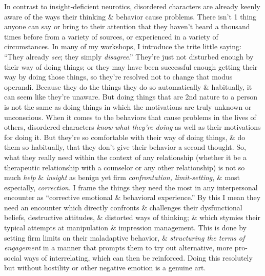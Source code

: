 \documentclass{article}
\numberwithin{equation}{section}
\begin{document}
In contrast to insight-deficient neurotics, disordered characters are already keenly aware of the ways their thinking \& behavior cause problems. There isn't 1 thing anyone can say or bring to their attention that they haven't heard a thousand times before from a variety of sources, or experienced in a variety of circumstances. In many of my workshops, I introduce the trite little saying: ``They already \textit{see}; they simply \textit{disagree}.'' They're just not disturbed enough by their way of doing things; or they may have been successful enough getting their way by doing those things, so they're resolved not to change that modus operandi. Because they do the things they do so automatically \& habitually, it can seem like they're unaware. But doing things that are 2nd nature to a person is not the same as doing things in which the motivations are truly unknown or unconscious. When it comes to the behaviors that cause problems in the lives of others, disordered characters \textit{know what they're doing} as well as their motivations for doing it. But they're so comfortable with their way of doing things, \& do them so habitually, that they don't give their behavior a second thought. So, what they really need within the context of any relationship (whether it be a therapeutic relationship with a counselor or any other relationship) is not so much \textit{help} \& \textit{insight} as benign yet firm \textit{confrontation, limit-setting}, \& most especially, \textit{correction}. I frame the things they need the most in any interpersonal encounter as ``corrective emotional \& behavioral experience.'' By this I mean they need an encounter which directly confronts \& challenges their dysfunctional beliefs, destructive attitudes, \& distorted ways of thinking; \& which stymies their typical attempts at manipulation \& impression management. This is done by setting firm limits on their maladaptive behavior, \& \textit{structuring the terms of engagement} in a manner that prompts them to try out alternative, more pro-social ways of interrelating, which can then be reinforced. Doing this resolutely but without hostility or other negative emotion is a genuine art.
\end{document}
